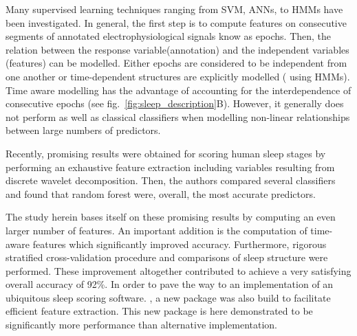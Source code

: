 Many supervised learning techniques ranging from SVM, ANNs, to HMMs have been investigated.
In general, the first step is to compute features on consecutive segments of annotated electrophysiological signals know as epochs.
Then, the relation between the response variable(annotation) and the independent variables (features) can be modelled.
Either epochs are considered to be independent from one another or time-dependent structures are explicitly modelled (\eg{} using HMMs).
Time aware modelling has the advantage of accounting for the interdependence of consecutive epochs (see fig.~\ref{fig:sleep_description}B).
However, it generally does not perform as well as classical classifiers when modelling non-linear relationships between large numbers of predictors.

Recently, promising results were obtained for scoring human sleep stages by performing an exhaustive
feature extraction including variables resulting from discrete wavelet decomposition.
Then, the authors compared several classifiers and found that random forest were, overall, the most accurate predictors.

The study herein bases itself on these promising results by computing an even larger number of features.
An important addition is the computation of time-aware features which significantly improved accuracy.
Furthermore, rigorous stratified cross-validation procedure and comparisons of sleep structure were performed.
These improvement altogether contributed to achieve a very satisfying overall accuracy of 92\%.
In order to pave the way to an implementation of an ubiquitous sleep scoring software.
\pr, a new \py{} package was also build to facilitate efficient feature extraction.
This new package is here demonstrated to be significantly more performance than alternative implementation.

